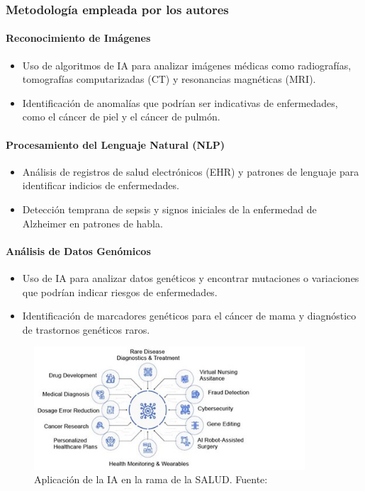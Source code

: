 \subsubsection{Metodología empleada por los autores}

\paragraph{Reconocimiento de Imágenes}
\begin{itemize}
    \item Uso de algoritmos de IA para analizar imágenes médicas como radiografías, tomografías computarizadas (CT) y resonancias magnéticas (MRI).
    \item Identificación de anomalías que podrían ser indicativas de enfermedades, como el cáncer de piel y el cáncer de pulmón.
\end{itemize}

\paragraph{Procesamiento del Lenguaje Natural (NLP)}
\begin{itemize}
    \item Análisis de registros de salud electrónicos (EHR) y patrones de lenguaje para identificar indicios de enfermedades.
    \item Detección temprana de sepsis y signos iniciales de la enfermedad de Alzheimer en patrones de habla.
\end{itemize}

\paragraph{Análisis de Datos Genómicos}
\begin{itemize}
    \item Uso de IA para analizar datos genéticos y encontrar mutaciones o variaciones que podrían indicar riesgos de enfermedades.
    \item Identificación de marcadores genéticos para el cáncer de mama y diagnóstico de trastornos genéticos raros.
\end{itemize}

\begin{figure}[H]
    \centering
    \includegraphics[width=0.9\textwidth]{images_repo/APLICACION.jpg}
    \caption{Aplicación de la IA en la rama de la SALUD. Fuente: \cite{santhoshkumar2023}}
    \label{Aplicación de la IA en la rama de la SALUD}
\end{figure}

